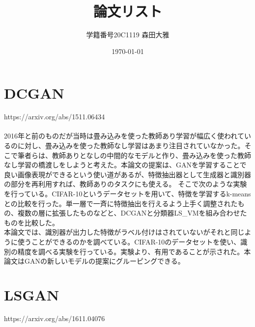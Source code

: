 \documentclass[dvipdfmx]{jsarticle}
\title{論文リスト}
\author{学籍番号20C1119 森田大雅}
\date{\today}
\begin{document}
\maketitle

\section{DCGAN}
\parindent=0pt https://arxiv.org/abs/1511.06434
\\\\

2016年と前のものだが当時は畳み込みを使った教師あり学習が幅広く使われているのに対し、畳み込みを使った教師なし学習はあまり注目されていなかった。そこで筆者らは、教師ありとなしの中間的なモデルと作り、畳み込みを使った教師なし学習の橋渡しをしようと考えた。本論文の提案は、GANを学習することで良い画像表現ができるという使い道があるが、特徴抽出器として生成器と識別器の部分を再利用すれば、教師ありのタスクにも使える。
そこで次のような実験を行っている。CIFAR-10というデータセットを用いて、特徴を学習するk-meansとの比較を行った。単一層で一斉に特徴抽出を行えるよう上手く調整されたもの、複数の層に拡張したものなどと、DCGANと分類器LS\_VMを組み合わせたものを比較した。
\\

本論文では、識別器が出力した特徴がラベル付けはされていないがそれと同じように使うことができるのかを調べている。CIFAR-10のデータセットを使い、識別の精度を調べる実験を行っている。実験より、有用であることが示された。本論文はGANの新しいモデルの提案にグルーピングできる。
\section{LSGAN}
\parindent=0pt https://arxiv.org/abs/1611.04076
\\\\
\end{document}
